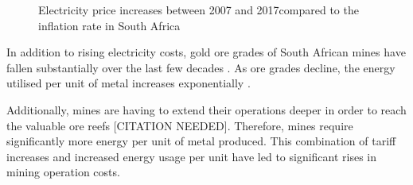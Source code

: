 		\begin{figure}[h]
			\centering
			\fbox{}
			\caption[Electricity price increases between 2007 and 2017 compared to the inflation rate in South Africa]{Electricity price increases between 2007 and 2017\protect\footnotemark[1] compared to the inflation rate in South Africa\protect\footnotemark[2]}
			\label{fig: Eskom tariffs}
		\end{figure}
	\clearpage
		\par
		In addition to rising electricity costs, gold ore grades of South African mines have fallen substantially over the last few decades \cite{mudd2007global}. As ore grades decline, the energy utilised per unit of metal increases exponentially \cite{muller2010numerical}. 
		\par
		Additionally, mines are having to extend their operations deeper in order to reach the valuable ore reefs [CITATION NEEDED]. Therefore, mines require significantly more energy per unit of metal produced. This combination of tariff increases and increased energy usage per unit have led to significant rises in mining operation costs.
